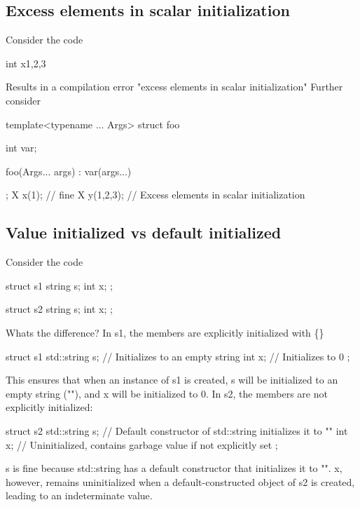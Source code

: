 \documentclass{report}
\begin{document}
    \bigbreak \noindent 
    \subsection{Excess elements in scalar initialization}
    \bigbreak \noindent 
    Consider the code
    \bigbreak \noindent 
    \begin{cppcode}
        int x{1,2,3}
    \end{cppcode}
    \bigbreak \noindent 
    Results in a compilation error "excess elements in scalar initialization"
    \bigbreak \noindent 
    Further consider
    \bigbreak \noindent 
    \begin{cppcode}
    template<typename ... Args>
    struct foo {
        int var;

        foo(Args... args) : var(args...) {}
    };
    X x(1); // fine
    X y(1,2,3); // Excess elements in scalar initialization
    \end{cppcode}



    \pagebreak 
    \bigbreak \noindent 
    \subsection{Value initialized vs default initialized}
    \bigbreak \noindent 
    Consider the code
    \bigbreak \noindent 
    \begin{cppcode}
        struct s1 {
            string s{};
            int x{};
        };

        struct s2 {
            string s;
            int x;
        };
    \end{cppcode}
    \bigbreak \noindent 
    Whats the difference? In s1, the members are explicitly initialized with \{\}
    \bigbreak \noindent 
    \begin{cppcode}
        struct s1 {
            std::string s{};  // Initializes to an empty string
            int x{};          // Initializes to 0
        };
    \end{cppcode}
    \bigbreak \noindent 
    This ensures that when an instance of s1 is created, s will be initialized to an empty string (""), and x will be initialized to 0.
    \bigbreak \noindent 
    In s2, the members are not explicitly initialized:
    \bigbreak \noindent 
    \begin{cppcode}
        struct s2 {
            std::string s;  // Default constructor of std::string initializes it to ""
            int x;          // Uninitialized, contains garbage value if not explicitly set
        };
    \end{cppcode}
    \bigbreak \noindent 
    s is fine because std::string has a default constructor that initializes it to "".
    \bigbreak \noindent 
    x, however, remains uninitialized when a default-constructed object of s2 is created, leading to an indeterminate value.
\end{document}

